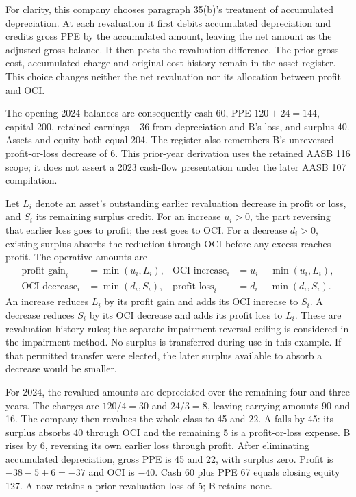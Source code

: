 For clarity, this company chooses paragraph 35(b)'s treatment of accumulated
depreciation. At each revaluation it first debits accumulated depreciation and
credits gross PPE by the accumulated amount, leaving the net amount as the
adjusted gross balance. It then posts the revaluation difference. The prior
gross cost, accumulated charge and original-cost history remain in the asset
register. This choice changes neither the net revaluation nor its allocation
between profit and OCI.

The opening 2024 balances are consequently cash 60, PPE $120+24=144$,
capital 200, retained earnings $-36$ from depreciation and B's loss, and
surplus 40. Assets and equity both equal 204. The register also remembers
B's unreversed profit-or-loss decrease of 6. This prior-year derivation uses
the retained AASB 116 scope; it does not assert a 2023 cash-flow presentation
under the later AASB 107 compilation.

Let $L_i$ denote an asset's outstanding earlier revaluation decrease in
profit or loss, and $S_i$ its remaining surplus credit. For an increase
$u_i>0$, the part reversing that earlier loss goes to profit; the rest goes
to OCI. For a decrease $d_i>0$, existing surplus absorbs the reduction through
OCI before any excess reaches profit. The operative amounts are
\[
\begin{aligned}
 \text{profit gain}_i&=\min(u_i,L_i),&
 \text{OCI increase}_i&=u_i-\min(u_i,L_i),\\
 \text{OCI decrease}_i&=\min(d_i,S_i),&
 \text{profit loss}_i&=d_i-\min(d_i,S_i).
\end{aligned}
\]
An increase reduces $L_i$ by its profit gain and adds its OCI increase to
$S_i$. A decrease reduces $S_i$ by its OCI decrease and adds its profit loss
to $L_i$. These are revaluation-history rules; the separate impairment
reversal ceiling is considered in the impairment method. No surplus is
transferred during use in this example. If that permitted transfer were
elected, the later surplus available to absorb a decrease would be smaller.

For 2024, the revalued amounts are depreciated over the remaining four and
three years. The charges are $120/4=30$ and $24/3=8$, leaving carrying
amounts 90 and 16. The company then revalues the whole class to 45 and 22.
A falls by 45: its surplus absorbs 40 through OCI and the remaining 5 is
a profit-or-loss expense. B rises by 6, reversing its own earlier loss
through profit. After eliminating accumulated depreciation, gross PPE is
45 and 22, with surplus zero. Profit is $-38-5+6=-37$ and OCI is $-40$.
Cash 60 plus PPE 67 equals closing equity 127. A now retains a prior
revaluation loss of 5; B retains none.

